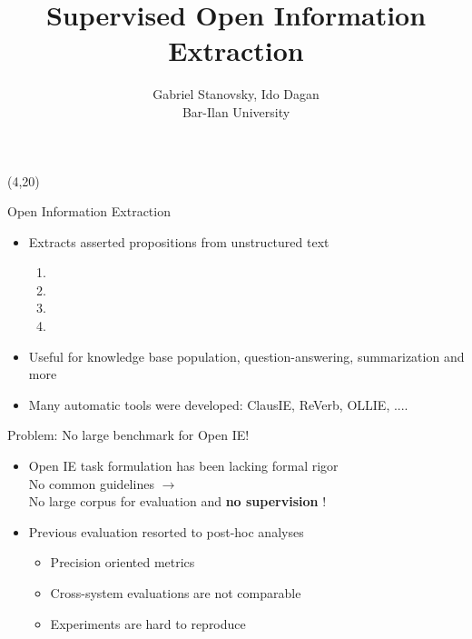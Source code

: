 \documentclass[final]{beamer}
\title{Supervised Open Information Extraction}
\author{Gabriel Stanovsky, Ido Dagan \\ Bar-Ilan University}
\date{}
\newcommand{\commonvspace}[0]{\vspace{1cm}}
\begin{document}
\begin{frame}{} 

\begin{textblock}{39}(4,20)
\begin{block}{Open Information Extraction}
  \begin{itemize}
        \setlength\itemsep{1em}
  \item Extracts asserted propositions from unstructured text
  \\
  \begin{enumerate}
  \item {}
  \item {}
  \item {}
  \item {}
  \end{enumerate}

\item Useful for knowledge base population, question-answering, summarization and more
\item Many automatic tools were developed: ClausIE, ReVerb, OLLIE, ....
  
  \end{itemize}

\end{block}

\commonvspace

\begin{block}{Problem: No large benchmark for Open IE!}
  \begin{itemize}
        \setlength\itemsep{1em}
  \item Open IE task formulation has been lacking formal rigor
    \\
    No common guidelines $\rightarrow$
    \\
    No large corpus for evaluation and \textbf{no supervision} !
  \item Previous evaluation resorted to post-hoc analyses
    \begin{itemize}
          \setlength\itemsep{1em}
    \item \alert{Precision oriented} metrics
    \item Cross-system evaluations are \alert{not comparable}
    \item Experiments are \alert{hard to reproduce}
    \end{itemize}
  \end{itemize}
\end{block}


\end{textblock}
\end{frame}
\end{document}
